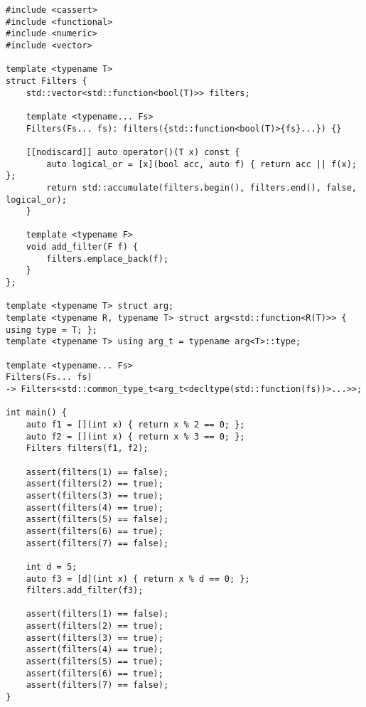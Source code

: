 \begin{lstlisting}[title=\href{https://godbolt.org/z/prsxs_}{\texttt{godbolt.org/z/prsxs\_}}]
#include <cassert>
#include <functional>
#include <numeric>
#include <vector>

template <typename T>
struct Filters {
    std::vector<std::function<bool(T)>> filters;

    template <typename... Fs>
    Filters(Fs... fs): filters({std::function<bool(T)>{fs}...}) {}

    [[nodiscard]] auto operator()(T x) const {
        auto logical_or = [x](bool acc, auto f) { return acc || f(x); };
        return std::accumulate(filters.begin(), filters.end(), false, logical_or);
    }

    template <typename F>
    void add_filter(F f) {
        filters.emplace_back(f);
    }  
};

template <typename T> struct arg;
template <typename R, typename T> struct arg<std::function<R(T)>> { using type = T; };
template <typename T> using arg_t = typename arg<T>::type;

template <typename... Fs>
Filters(Fs... fs)
-> Filters<std::common_type_t<arg_t<decltype(std::function(fs))>...>>;

int main() {
    auto f1 = [](int x) { return x % 2 == 0; };
    auto f2 = [](int x) { return x % 3 == 0; };
    Filters filters(f1, f2);

    assert(filters(1) == false);
    assert(filters(2) == true);
    assert(filters(3) == true);
    assert(filters(4) == true);
    assert(filters(5) == false);
    assert(filters(6) == true);
    assert(filters(7) == false);

    int d = 5;
    auto f3 = [d](int x) { return x % d == 0; };
    filters.add_filter(f3);

    assert(filters(1) == false);
    assert(filters(2) == true);
    assert(filters(3) == true);
    assert(filters(4) == true);
    assert(filters(5) == true);
    assert(filters(6) == true);
    assert(filters(7) == false);
}
\end{lstlisting}
